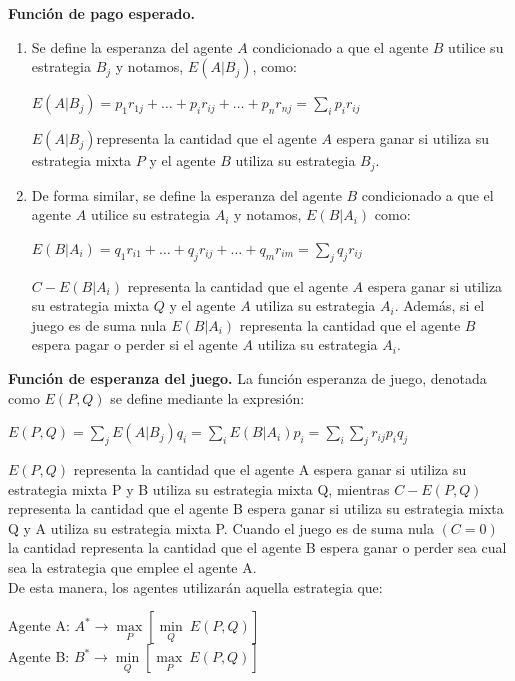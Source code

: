 \begin{definicion}\label{Def:Fun_pag_esp}
\textbf{Función de pago esperado.}
\begin{enumerate}
    \item Se define la esperanza del agente $A$ condicionado a que el agente $B$ utilice su estrategia $B_j$ y notamos, $E(A|B_j)$, como:
    \begin{center}
        $E(A|B_j) = p_1r_{1j}+\ldots+p_ir_{ij}+\ldots+p_nr_{nj} = \underset{i}{\sum}p_ir_{ij}$
    \end{center}
     $E(A|B_j)$representa la cantidad que el agente $A$ espera ganar si utiliza su estrategia mixta $P$ y el agente $B$ utiliza su estrategia $B_j$.
     
    \item De forma similar, se define  la esperanza del agente $B$ condicionado a que el agente $A$ utilice su estrategia $A_i$ y notamos, $E(B|A_i)$ como:
    \begin{center}
        $E(B|A_i) = q_1r_{i1}+\ldots+q_jr_{ij}+\ldots+q_mr_{im} = \underset{j}{\sum}q_jr_{ij}$
    \end{center}
    $C-E(B|A_i)$ representa la cantidad que el agente $A$ espera ganar si utiliza su estrategia mixta $Q$  y el agente $A$ utiliza su estrategia $A_i$. Además, si el juego es de suma nula $E(B|A_i)$ representa la cantidad que el agente $B$ espera pagar o perder si el agente $A$ utiliza su estrategia $A_i$.
\end{enumerate}
\end{definicion}

\begin{definicion}\label{Def:Func_esp_j}
\textbf{Función de esperanza del juego.}
La función esperanza de juego, denotada como $E(P,Q)$ se define mediante la expresión:
\begin{center}
    $E(P,Q) = \underset{j}{\sum}E(A|B_j)q_i = \underset{i}{\sum}E(B|A_i)p_i = \underset{i}{\sum}\underset{j}{\sum}r_{ij}p_i q_j$
\end{center}
$E(P,Q)$ representa la cantidad que el agente A espera ganar si utiliza su estrategia mixta P y B utiliza su estrategia mixta Q, mientras $C-E(P,Q)$ representa la cantidad que el agente B espera ganar si utiliza su estrategia mixta Q y A utiliza su estrategia mixta P. Cuando el juego es de suma nula $(C=0)$ la cantidad  representa la cantidad que el agente B espera ganar o perder sea cual sea la estrategia que emplee el agente A.
\\
De esta manera, los agentes utilizarán aquella estrategia que:
\begin{center}
   Agente A: $A^* \rightarrow \underset{P}{\max}\left[ \underset{Q}{\min} \: E(P,Q) \right] $ \\
   Agente B: $B^* \rightarrow \underset{Q}{\min}\left[ \underset{P}{\max} \: E(P,Q) \right]  $
\end{center}
\end{definicion}

